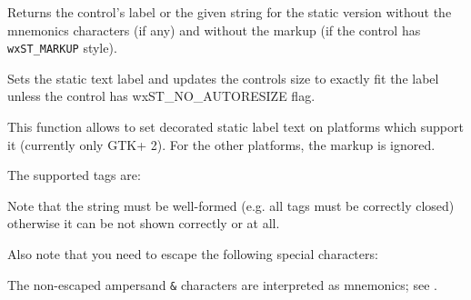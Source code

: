 \label{wxstatictextgetlabeltext}


Returns the control's label or the given  string for the static
version without the mnemonics characters (if any) and without the markup
(if the control has \texttt{wxST\_MARKUP} style).



\label{wxstatictextsetlabel}


Sets the static text label and updates the controls size to exactly fit the
label unless the control has wxST\_NO\_AUTORESIZE flag.

This function allows to set decorated static label text on platforms which
support it (currently only GTK+ 2). For the other platforms, the markup is
ignored.

The supported tags are:

\twocolwidtha{5cm}
\begin{twocollist}\itemsep=0pt
\end{twocollist}

Note that the string must be well-formed (e.g. all tags must be correctly closed)
otherwise it can be not shown correctly or at all.

Also note that you need to escape the following special characters:

\twocolwidtha{5cm}
\begin{twocollist}\itemsep=0pt
\end{twocollist}

The non-escaped ampersand \texttt{&} characters are interpreted as
mnemonics; see .


